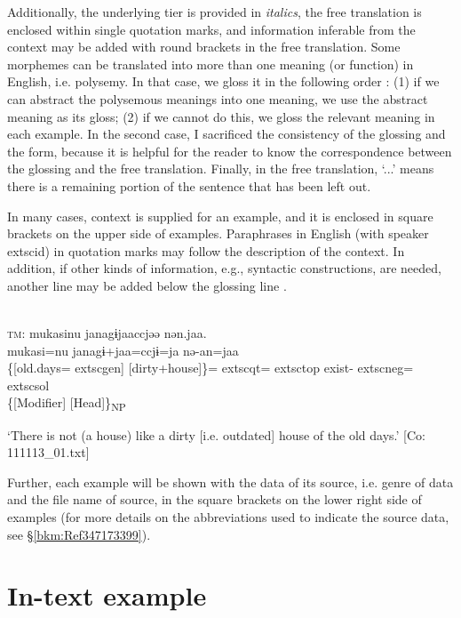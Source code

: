 Additionally, the underlying tier is provided in \textit{italics}, the free translation is enclosed within single quotation marks, and information inferable from the context may be added with round brackets in the free translation. Some morphemes can be translated into more than one meaning (or function) in English, i.e. polysemy. In that case, we gloss it in the following order \citep[cf.][11--12]{Lehmann2004}: (1) if we can abstract the polysemous meanings into one meaning, we use the abstract meaning as its gloss; (2) if we cannot do this, we gloss the relevant meaning in each example. In the second case, I sacrificed the consistency of the glossing and the form, because it is helpful for the reader to know the correspondence between the glossing and the free translation. Finally, in the free translation, ‘...’ means there is a remaining portion of the sentence that has been left out.

In many cases, context is supplied for an example, and it is enclosed in square brackets on the upper side of examples. Paraphrases in English (with speaker 	extsc{id}) in quotation marks may follow the description of the context. In addition, if other kinds of information, e.g., syntactic constructions, are needed, another line may be added below the glossing line \citep[cf.][4--5]{Lehmann2004}.

\ea{}\\
	\textsc{tm}: \gllll mukasinu janagɨjaaccjəə nən.jaa.\\
          mukasi=nu janagɨ+jaa=ccjɨ=ja nə-an=jaa\\
          \{[old.days=	extsc{gen}] [dirty+house]\}=	extsc{qt}=	extsc{top} exist-	extsc{neg}=	extsc{sol}\\
          \{[Modifier] [Head]\}\textsubscript{NP}\\
   \glt{} \parbox[t]{10cm}{‘There is not (a house) like a dirty [i.e. outdated] house of the old days.’ [Co: 111113\_01.txt]}

\z

Further, each example will be shown with the data of its source, i.e. genre of data and the file name of source, in the square brackets on the lower right side of examples (for more details on the abbreviations used to indicate the source data, see §\ref{bkm:Ref347173399}).

\section*{In-text example}


